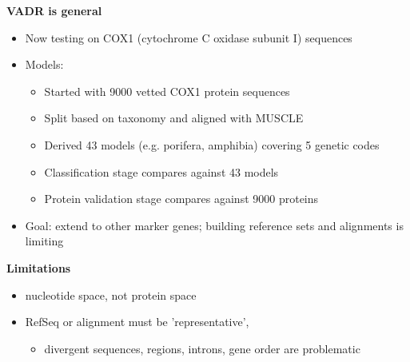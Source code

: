 \documentclass[landscape]{slides}
\begin{document}
\begin{slide}
\begin{center}
\textbf{VADR is general}
\end{center}

\small
\begin{itemize}
\item Now testing on COX1 (cytochrome C oxidase subunit I) sequences
\item Models:
  \begin{itemize}
  \item Started with 9000 vetted COX1 protein sequences
  \item Split based on taxonomy and aligned with MUSCLE
  \item Derived 43 models (e.g. porifera, amphibia) covering 5 genetic codes
  \item Classification stage compares against 43 models
  \item Protein validation stage compares against 9000 proteins
  \end{itemize}
\item Goal: extend to other marker genes; building reference
  sets and alignments is limiting
\end{itemize}

\vfill
\end{slide}
\begin{slide}
\begin{center}
\textbf{Limitations}
\end{center}

\small
\begin{itemize}
\item nucleotide space, not protein space
\item RefSeq or alignment must be 'representative',
  \begin{itemize}
    \item divergent sequences, regions, introns, gene order are problematic
  \end{itemize}
\end{itemize}

\vfill
\end{slide}
\end{document}
